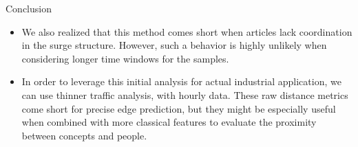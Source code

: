\documentclass[final]{beamer}
\newlength{\onecolwid}
\begin{document}
\begin{frame}[t]
\begin{columns}[t]
\begin{column}{\onecolwid}
\begin{block}{Conclusion}
\begin{itemize}
  \item We also realized that this method comes short when articles lack coordination in the surge structure. However, such a behavior is highly unlikely when considering longer time windows for the samples.

  \item In order to leverage this initial analysis for actual industrial application, we can use thinner traffic analysis, with hourly data. These raw distance metrics come short for precise edge prediction, but they might be especially useful when combined with more classical features to evaluate the proximity between concepts and people.
\end{itemize}


\begin{center}
\end{center}
\end{block}











\end{column}
\end{columns}
\end{frame}
\end{document}
